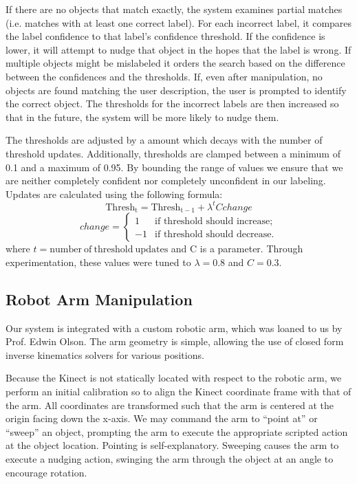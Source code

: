\documentclass[11pt]{article}
\begin{document}
If there are no objects that match exactly, the system examines partial
matches (i.e. matches with at least one correct label). For each incorrect label, it compares the
label confidence to that label's confidence threshold. If the confidence is
lower, it will attempt to nudge that object in the hopes that the label
is wrong. If multiple objects might be mislabeled it orders the search
based on the difference between the confidences and the thresholds. If, even after
manipulation, no objects are found matching the user description, the user is
prompted to identify the correct object. The thresholds for the incorrect
labels are then increased so that in the future, the system will be more
likely to nudge them.

The thresholds are adjusted by a amount which decays with the number of
threshold updates. Additionally, thresholds are clamped between a minimum of
0.1 and a maximum of 0.95. By bounding the range of values we ensure that we are neither completely confident nor completely unconfident in our labeling. 
Updates are calculated using the following formula:
$$\mathrm{Thresh_{t}} = \mathrm{Thresh_{t-1}} + \lambda^t C change$$
\[change = \left\{ \begin{array}{ll}
         1 & \mbox{if threshold should increase};\\
         -1 & \mbox{if threshold should decrease}.\end{array} \right. \]
where $t= \mathrm{number~of~threshold~updates}$ and C is a parameter. Through
experimentation, these values were tuned to $\lambda = 0.8$ and $C = 0.3$.

\subsection{Robot Arm Manipulation}
Our system is integrated with a custom robotic arm, which was loaned to us by Prof.
Edwin Olson. The arm geometry is simple, allowing the use of closed form inverse
kinematics solvers for various positions.

Because the Kinect is not statically located with respect to the robotic arm,
we perform an initial calibration so to align the Kinect coordinate
frame with that of the arm. All coordinates are transformed such that the arm
is centered at the origin facing down the x-axis. We
may command the arm to ``point at'' or ``sweep'' an object, prompting the arm
to execute the appropriate scripted action at the object location. Pointing is
self-explanatory. Sweeping causes the arm to execute a nudging action,
swinging the arm through the object at an angle to encourage rotation.
\end{document}
